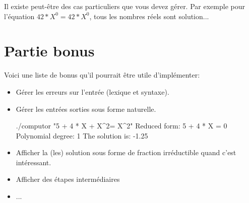 \documentclass{42}
\begin{document}
    Il existe peut-\^etre des cas particuliers que vous devez
    g\'erer. Par exemple pour l'\'equation $42 * X^0 = 42 * X^0$, tous
    les nombres r\'eels sont solution...\\




\chapter{Partie bonus}

    Voici une liste de bonus qu'il pourrait être utile d'implémenter:\\

    \begin{itemize}

        \item Gérer les erreurs sur l'entrée (lexique et syntaxe).

	    \item Gérer les entrées sorties sous forme naturelle.
        \begin{42console}
./computor "5 + 4 * X + X^2= X^2"
Reduced form: 5 + 4 * X = 0
Polynomial degree: 1
The solution is:
-1.25\end{42console}

        \item Afficher la (les) solution sous forme de fraction
          irréductible quand c'est intéressant.

	    \item Afficher des étapes intermédiaires

	    \item ...

    \end{itemize}

\end{document}
